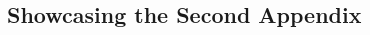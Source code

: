 \begin{landscapemode}{297mm}{420mm}
    \chapter{Showcasing the Second Appendix}
    \blindtext[5]
\end{landscapemode}